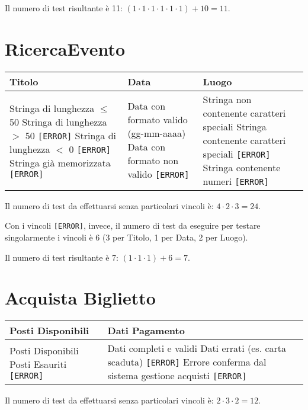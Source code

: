 \noindent Il numero di test risultante è 11: $(1 \cdot 1 \cdot 1 \cdot 1 \cdot 1 \cdot 1) + 10 = 11$.

\section{RicercaEvento}
\begin{table}[H]
	\centering
	\footnotesize
	\renewcommand{\arraystretch}{1.3}
	\begin{tabular}{|p{2.5cm}|p{2.5cm}|p{2.5cm}|}
		\hline
		\textbf{Titolo} & \textbf{Data} & \textbf{Luogo} \\
		\hline
		Stringa di lunghezza $\leq$ 50 \newline
		Stringa di lunghezza $>$ 50 \texttt{[ERROR]} \newline
		Stringa di lunghezza $<$ 0 \texttt{[ERROR]} \newline
		Stringa già memorizzata \texttt{[ERROR]} &
		
		Data con formato valido (gg-mm-aaaa) \newline
		Data con formato non valido \texttt{[ERROR]} &
		
		Stringa non contenente caratteri speciali \newline
		Stringa contenente caratteri speciali \texttt{[ERROR]} \newline
		Stringa contenente numeri \texttt{[ERROR]} \\
		\hline
	\end{tabular}
\end{table}

\noindent Il numero di test da effettuarsi senza particolari vincoli è:
$4 \cdot 2 \cdot 3 = 24$.

\noindent Con i vincoli \texttt{[ERROR]}, invece, il numero di test da eseguire per testare singolarmente i vincoli è 6 (3 per Titolo, 1 per Data, 2 per Luogo).

\noindent Il numero di test risultante è 7: $(1 \cdot 1 \cdot 1) + 6 = 7$.

\section{Acquista Biglietto}
\begin{table}[H]
	\centering
	\footnotesize
	\renewcommand{\arraystretch}{1.3}
	\begin{tabular}{|p{4cm}|p{4cm}|}
		\hline
		\textbf{Posti Disponibili} & \textbf{Dati Pagamento} \\
		\hline
		Posti Disponibili \newline
		Posti Esauriti \texttt{[ERROR]} &
		
		Dati completi e validi \newline
		Dati errati (es. carta scaduta) \texttt{[ERROR]} \newline
		Errore conferma dal sistema gestione acquisti \texttt{[ERROR]} \\
		\hline
	\end{tabular}
\end{table}
\noindent Il numero di test da effettuarsi senza particolari vincoli è:
$2 \cdot 3 \cdot 2 = 12$.

